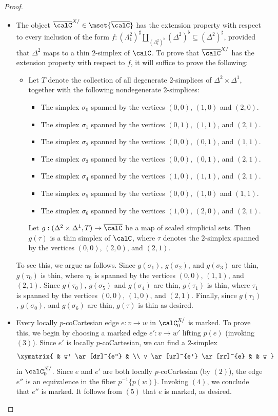 \begin{proof}
\begin{itemize}
\item[$(5)$] The object $\overline{\calC}^{X/} \in \mset{ \overline{\calC} }$ has the extension
property with respect to every inclusion of the form  
$f: ( \Lambda^2_1)^{\sharp} \coprod_{ (\Lambda^2_{1})^{\flat}} (\Delta^2)^{\flat}  \subseteq (\Delta^2)^{\sharp}$, provided that $\Delta^2$ maps to a thin
$2$-simplex of $\calC$. To prove that $\overline{\calC}^{X/}$ has the extension property with respect to $f$, it will suffice to prove the following:
\begin{itemize}
\item[$(\ast)$] Let $T$ denote the collection of all degenerate $2$-simplices of
$\Delta^2 \times \Delta^1$, together with the following nondegenerate $2$-simplices:
\begin{itemize}
\item The simplex $\sigma_0$ spanned by the vertices $(0,0)$, $(1,0)$ and $(2,0)$.
\item The simplex $\sigma_1$ spanned by the vertices $(0,1)$, $(1,1)$, and $(2,1)$.
\item The simplex $\sigma_2$ spanned by the vertices $(0,0)$, $(0,1)$, and $(1,1)$.
\item The simplex $\sigma_3$ spanned by the vertices $(0,0)$, $(0,1)$, and $(2,1)$.
\item The simplex $\sigma_4$ spanned by the vertices $(1,0)$, $(1,1)$, and $(2,1)$.
\item The simplex $\sigma_5$ spanned by the vertices $(0,0)$, $(1,0)$ and $(1,1)$.
\item The simplex $\sigma_6$ spanned by the vertices $(1,0)$, $(2,0)$, and $(2,1)$.
\end{itemize}
Let $g: ( \Delta^2 \times \Delta^1, T) \rightarrow \overline{\calC}$ be a map of scaled simplicial sets.
Then $g(\tau)$ is a thin simplex of $\calC$, where $\tau$ denotes the $2$-simplex spanned by the vertices $(0,0)$, $(2,0)$, and $(2,1)$.
\end{itemize}
To see this, we argue as follows. Since $g(\sigma_1)$, $g(\sigma_2)$, and $g(\sigma_3)$ are
thin, $g(\tau_0)$ is thin, where $\tau_0$ is spanned by the vertices $(0,0)$, $(1,1)$, and $(2,1)$.
Since $g(\tau_0)$, $g(\sigma_5)$ and $g(\sigma_4)$ are thin, $g(\tau_1)$ is thin, where
$\tau_1$ is spanned by the vertices $(0,0)$, $(1,0)$, and $(2,1)$. Finally, since
$g(\tau_1)$, $g(\sigma_0)$, and $g(\sigma_6)$ are thin, $g(\tau)$ is thin as desired.

\item[$(6)$] Every locally $p$-coCartesian edge $e: v \rightarrow w$ in $\calC^{X/}_{0}$ is marked.
To prove this, we begin by choosing a marked edge $e': v \rightarrow w'$ lifting
$p(e)$ (invoking $(3)$). Since $e'$ is locally $p$-coCartesian, we can find a $2$-simplex
$$ \xymatrix{ & w' \ar[dr]^{e''} & \\
v \ar[ur]^{e'} \ar[rr]^{e} & & w }$$
in $\calC^{X/}_0$. Since $e$ and $e'$ are both locally $p$-coCartesian (by $(2)$), the edge
$e''$ is an equivalence in the fiber $p^{-1} \{ p(w) \}$. Invoking $(4)$, we conclude that
$e''$ is marked. It follows from $(5)$ that $e$ is marked, as desired.


\end{itemize}
\end{proof}
